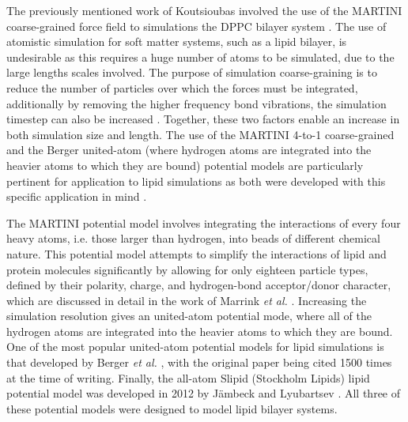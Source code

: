 \documentclass[amsmath,amssymb,twocolumn,superscriptaddress]{revtex4-1}
\begin{document}
The previously mentioned work of Koutsioubas involved the use of the MARTINI coarse-grained force field to simulations the DPPC bilayer system \cite{koutsioubas_combined_2016}.
The use of atomistic simulation for soft matter systems, such as a lipid bilayer, is undesirable as this requires a huge number of atoms to be simulated, due to the large lengths scales involved.
The purpose of simulation coarse-graining is to reduce the number of particles over which the forces must be integrated, additionally by removing the higher frequency bond vibrations, the simulation timestep can also be increased \cite{pluhackova_biomembranes_2015}.
Together, these two factors enable an increase in both simulation size and length.
The use of the MARTINI 4-to-1 coarse-grained and the Berger united-atom (where hydrogen atoms are integrated into the heavier atoms to which they are bound) potential models are particularly pertinent for application to lipid simulations as both were developed with this specific application in mind \cite{marrink_martini_2007,berger_molecular_1997}.

The MARTINI potential model involves integrating the interactions of every four heavy atoms, i.e. those larger than hydrogen, into beads of different chemical nature.
This potential model attempts to simplify the interactions of lipid and protein molecules significantly by allowing for only eighteen particle types, defined by their polarity, charge, and hydrogen-bond acceptor/donor character, which are discussed in detail in the work of Marrink \emph{et al.} \cite{marrink_martini_2007}.
Increasing the simulation resolution gives an united-atom potential mode, where all of the hydrogen atoms are integrated into the heavier atoms to which they are bound.
One of the most popular united-atom potential models for lipid simulations is that developed by Berger \emph{et al.} \cite{berger_molecular_1997}, with the original paper being cited 1500 times at the time of writing.
Finally, the all-atom Slipid (Stockholm Lipids) lipid potential model was developed in 2012 by J\"{a}mbeck and Lyubartsev \cite{jambeck_derivation_2012}.
All three of these potential models were designed to model lipid bilayer systems.
\end{document}
